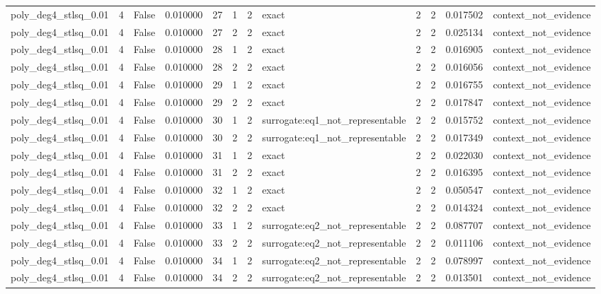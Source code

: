 \begin{tabular}{lrrrrrrlrrrl}
poly\_deg4\_stlsq\_0.01 & 4 & False & 0.010000 & 27 & 1 & 2 & exact & 2 & 2 & 0.017502 & context\_not\_evidence \\
poly\_deg4\_stlsq\_0.01 & 4 & False & 0.010000 & 27 & 2 & 2 & exact & 2 & 2 & 0.025134 & context\_not\_evidence \\
poly\_deg4\_stlsq\_0.01 & 4 & False & 0.010000 & 28 & 1 & 2 & exact & 2 & 2 & 0.016905 & context\_not\_evidence \\
poly\_deg4\_stlsq\_0.01 & 4 & False & 0.010000 & 28 & 2 & 2 & exact & 2 & 2 & 0.016056 & context\_not\_evidence \\
poly\_deg4\_stlsq\_0.01 & 4 & False & 0.010000 & 29 & 1 & 2 & exact & 2 & 2 & 0.016755 & context\_not\_evidence \\
poly\_deg4\_stlsq\_0.01 & 4 & False & 0.010000 & 29 & 2 & 2 & exact & 2 & 2 & 0.017847 & context\_not\_evidence \\
poly\_deg4\_stlsq\_0.01 & 4 & False & 0.010000 & 30 & 1 & 2 & surrogate:eq1\_not\_representable & 2 & 2 & 0.015752 & context\_not\_evidence \\
poly\_deg4\_stlsq\_0.01 & 4 & False & 0.010000 & 30 & 2 & 2 & surrogate:eq1\_not\_representable & 2 & 2 & 0.017349 & context\_not\_evidence \\
poly\_deg4\_stlsq\_0.01 & 4 & False & 0.010000 & 31 & 1 & 2 & exact & 2 & 2 & 0.022030 & context\_not\_evidence \\
poly\_deg4\_stlsq\_0.01 & 4 & False & 0.010000 & 31 & 2 & 2 & exact & 2 & 2 & 0.016395 & context\_not\_evidence \\
poly\_deg4\_stlsq\_0.01 & 4 & False & 0.010000 & 32 & 1 & 2 & exact & 2 & 2 & 0.050547 & context\_not\_evidence \\
poly\_deg4\_stlsq\_0.01 & 4 & False & 0.010000 & 32 & 2 & 2 & exact & 2 & 2 & 0.014324 & context\_not\_evidence \\
poly\_deg4\_stlsq\_0.01 & 4 & False & 0.010000 & 33 & 1 & 2 & surrogate:eq2\_not\_representable & 2 & 2 & 0.087707 & context\_not\_evidence \\
poly\_deg4\_stlsq\_0.01 & 4 & False & 0.010000 & 33 & 2 & 2 & surrogate:eq2\_not\_representable & 2 & 2 & 0.011106 & context\_not\_evidence \\
poly\_deg4\_stlsq\_0.01 & 4 & False & 0.010000 & 34 & 1 & 2 & surrogate:eq2\_not\_representable & 2 & 2 & 0.078997 & context\_not\_evidence \\
poly\_deg4\_stlsq\_0.01 & 4 & False & 0.010000 & 34 & 2 & 2 & surrogate:eq2\_not\_representable & 2 & 2 & 0.013501 & context\_not\_evidence \\

\end{tabular}
